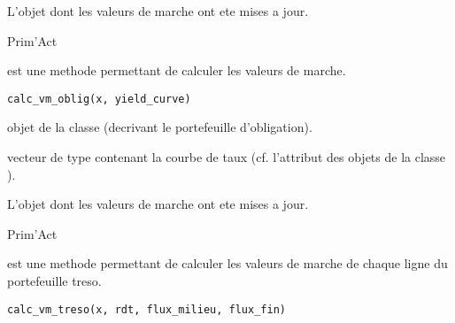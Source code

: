 \documentclass[a4paper]{book}
\begin{document}
%
\begin{Value}
L'objet  dont les valeurs de marche ont ete mises a jour.
\end{Value}
%
\begin{Author}\relax
Prim'Act
\end{Author}
%
\begin{Description}\relax
{} est une methode permettant de calculer les valeurs de marche.
\end{Description}
%
\begin{Usage}
\begin{verbatim}
calc_vm_oblig(x, yield_curve)
\end{verbatim}
\end{Usage}
%
\begin{Arguments}
\begin{ldescription}
\item[\code{x}] objet de la classe  (decrivant le portefeuille d'obligation).

\item[\code{yield\_curve}] vecteur de type  contenant la courbe de taux 
(cf. l'attribut  des objets de la classe ).
\end{ldescription}
\end{Arguments}
%
\begin{Value}
L'objet  dont les valeurs de marche ont ete mises a jour.
\end{Value}
%
\begin{Author}\relax
Prim'Act
\end{Author}
%
\begin{Description}\relax
{} est une methode permettant de calculer les valeurs de marche de chaque ligne du portefeuille treso.
\end{Description}
%
\begin{Usage}
\begin{verbatim}
calc_vm_treso(x, rdt, flux_milieu, flux_fin)
\end{verbatim}
\end{Usage}
%
\end{document}
